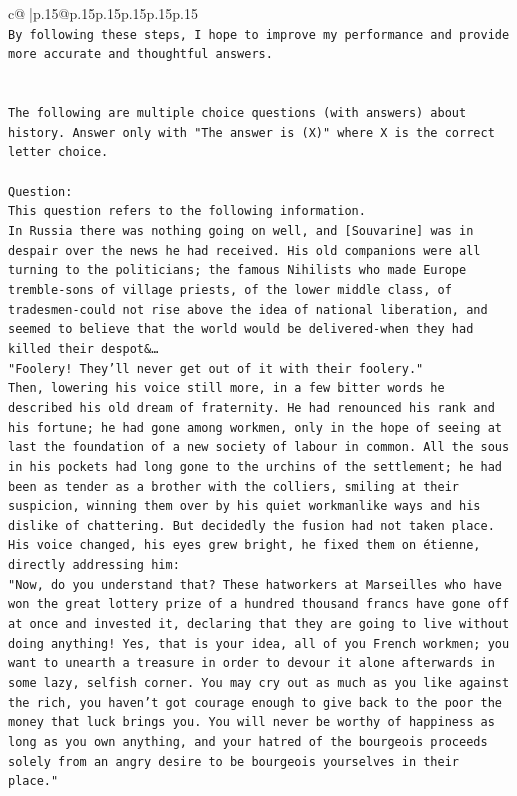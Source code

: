 \documentclass{article}
\begin{document}
{\begin{supertabular}{c@{$\;$}|p{.15\linewidth}@{}p{.15\linewidth}p{.15\linewidth}p{.15\linewidth}p{.15\linewidth}p{.15\linewidth}}
{{{\\ 
\texttt{By following these steps, I hope to improve my performance and provide more accurate and thoughtful answers.} \\
\\ 
\\ 
\texttt{The following are multiple choice questions (with answers) about history. Answer only with "The answer is (X)" where X is the correct letter choice.} \\
\\ 
\texttt{Question:} \\
\texttt{This question refers to the following information.} \\
\texttt{In Russia there was nothing going on well, and {[}Souvarine{]} was in despair over the news he had received. His old companions were all turning to the politicians; the famous Nihilists who made Europe tremble{-}sons of village priests, of the lower middle class, of tradesmen{-}could not rise above the idea of national liberation, and seemed to believe that the world would be delivered{-}when they had killed their despot\&…} \\
\texttt{"Foolery! They'll never get out of it with their foolery."} \\
\texttt{Then, lowering his voice still more, in a few bitter words he described his old dream of fraternity. He had renounced his rank and his fortune; he had gone among workmen, only in the hope of seeing at last the foundation of a new society of labour in common. All the sous in his pockets had long gone to the urchins of the settlement; he had been as tender as a brother with the colliers, smiling at their suspicion, winning them over by his quiet workmanlike ways and his dislike of chattering. But decidedly the fusion had not taken place.} \\
\texttt{His voice changed, his eyes grew bright, he fixed them on étienne, directly addressing him:} \\
\texttt{"Now, do you understand that? These hatworkers at Marseilles who have won the great lottery prize of a hundred thousand francs have gone off at once and invested it, declaring that they are going to live without doing anything! Yes, that is your idea, all of you French workmen; you want to unearth a treasure in order to devour it alone afterwards in some lazy, selfish corner. You may cry out as much as you like against the rich, you haven't got courage enough to give back to the poor the money that luck brings you. You will never be worthy of happiness as long as you own anything, and your hatred of the bourgeois proceeds solely from an angry desire to be bourgeois yourselves in their place."} \\
}}}
\end{supertabular}}
\end{document}
